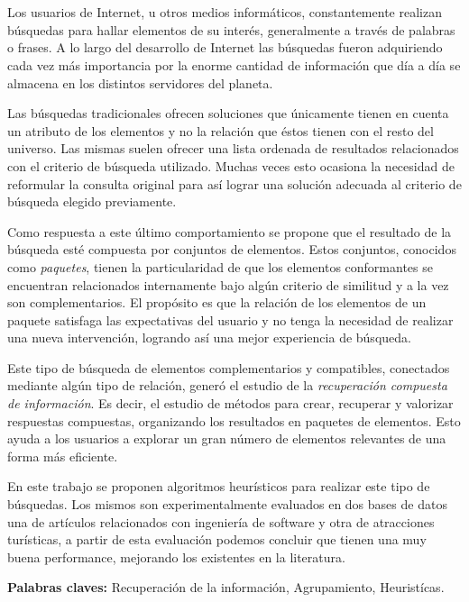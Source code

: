 \chapter*{\runtitle}

\noindent 

Los usuarios de Internet, u otros medios informáticos, constantemente realizan búsquedas para hallar elementos de su interés, generalmente a través de palabras o frases. A lo largo del desarrollo de Internet las búsquedas fueron adquiriendo cada vez más importancia por la enorme cantidad de información que día a día se almacena en los distintos servidores del planeta.

Las búsquedas tradicionales ofrecen soluciones que únicamente tienen en cuenta un atributo de los elementos y no la relación que éstos tienen con el resto del universo. Las mismas suelen ofrecer una lista ordenada de resultados relacionados con el criterio de búsqueda utilizado. Muchas veces esto ocasiona la necesidad de reformular la consulta original para así lograr una solución adecuada al criterio de búsqueda elegido previamente.

Como respuesta a este último comportamiento se propone que el resultado de la búsqueda esté compuesta por conjuntos de elementos. Estos conjuntos, conocidos como {\em paquetes}, tienen la particularidad de que los elementos conformantes se encuentran relacionados internamente bajo algún criterio de similitud y a la vez son complementarios. El propósito es que la relación de los elementos de un paquete satisfaga las expectativas del usuario y no tenga la necesidad de realizar una nueva intervención, logrando así una mejor experiencia de búsqueda.

Este tipo de búsqueda de elementos complementarios y compatibles, conectados mediante algún tipo de relación, generó el estudio de la {\em recuperación compuesta de información}. Es decir, el estudio de métodos para crear, recuperar y valorizar respuestas compuestas, organizando los resultados en paquetes de elementos. Esto ayuda a los usuarios a explorar un gran número de elementos relevantes de una forma más eficiente.

En este trabajo se proponen algoritmos heurísticos para realizar este tipo de búsquedas. Los mismos son experimentalmente evaluados en dos bases de datos una de artículos relacionados con ingeniería de software y otra de atracciones turísticas, a partir de esta evaluación podemos concluir que tienen una muy buena performance, mejorando los existentes en la literatura.
\bigskip


\noindent\textbf{Palabras claves:} Recuperación de la información, Agrupamiento, Heuristícas.